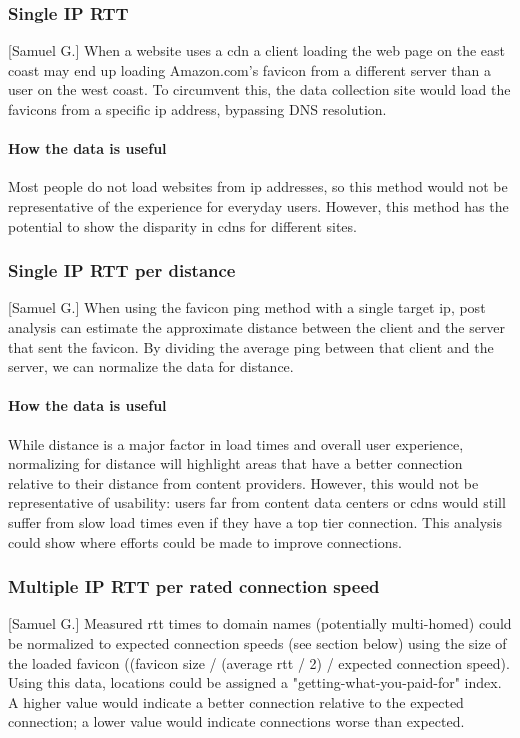\documentclass[12pt]{article}
\begin{document}
\subsubsection{Single IP RTT}[Samuel G.]
When a website uses a \acrshort{cdn} a client loading the web page on the east coast may end up loading Amazon.com's favicon from a different server than a user on the west coast. To circumvent this, the data collection site would load the favicons from a specific \acrshort{ip} address, bypassing DNS resolution.

\paragraph{How the data is useful}
Most people do not load websites from \acrshort{ip} addresses, so this method would not be representative of the experience for everyday users. However, this method has the potential to show the disparity in \acrshort{cdn}s for different sites.

\subsubsection{Single IP RTT per distance}[Samuel G.]
When using the favicon ping method with a single target \acrshort{ip}, post analysis can estimate the approximate distance between the client and the server that sent the favicon. By dividing the average ping between that client and the server, we can normalize the data for distance.

\paragraph{How the data is useful}
While distance is a major factor in load times and overall user experience, normalizing for distance will highlight areas that have a better connection relative to their distance from content providers. However, this would not be representative of usability: users far from content data centers or \acrshort{cdn}s would still suffer from slow load times even if they have a top tier connection. This analysis could show where efforts could be made to improve connections.

\subsubsection{Multiple IP RTT per rated connection speed}[Samuel G.]
Measured \acrshort{rtt} times to domain names (potentially multi-homed) could be normalized to expected connection speeds (see section below) using the size of the loaded favicon ((favicon size / (average \acrshort{rtt} / 2) / expected connection speed). Using this data, locations could be assigned a "getting-what-you-paid-for" index. A higher value would indicate a better connection relative to the expected connection; a lower value would indicate connections worse than expected.
\end{document}
